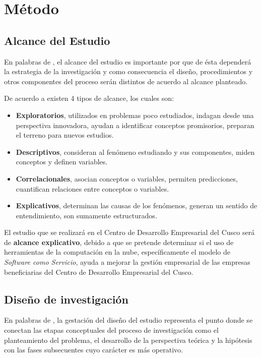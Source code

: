 
\chapter{Método}
\section{Alcance del Estudio}
En palabras de \cite{sampieri}, el alcance del estudio es importante por que de
ésta dependerá la estrategia de la investigación y como consecuencia el diseño,
procedimientos y otros componentes del proceso serán distintos de acuerdo al alcance
planteado.

De acuerdo a \cite{sampieri} existen 4 tipos de alcance, los cuales son:
\begin{itemize}
    \item \textbf{Exploratorios}, utilizados en problemas poco estudiados, indagan
          desde una perspectiva innovadora, ayudan a identificar conceptos promisorios,
          preparan el terreno para nuevos estudios.
    \item \textbf{Descriptivos}, consideran al fenómeno estudiando y sus componentes,
          miden conceptos y definen variables.
    \item \textbf{Correlacionales}, asocian conceptos o variables, permiten predicciones,
          cuantifican relaciones entre conceptos o variables.
    \item \textbf{Explicativos}, determinan las causas de los fenómenos, generan un
          sentido de entendimiento, son sumamente estructurados.
\end{itemize}

El estudio que se realizará en el Centro de Desarrollo Empresarial del Cusco será
de \textbf{alcance explicativo}, debido a que se pretende determinar si el uso
de herramientas de la computación en la nube, específicamente el modelo de
\emph{Software como Servicio}, ayuda a mejorar la gestión empresarial de las empresas
beneficiarias del Centro de Desarrollo Empresarial del Cusco.

\section{Diseño de investigación}
En palabras de \cite{sampieri}, la gestación del diseño del estudio representa
el punto donde se conectan las etapas conceptuales del proceso de investigación
como el planteamiento del problema, el desarrollo de la perspectiva teórica y
la hipótesis con las fases subsecuentes cuyo carácter es más operativo.

